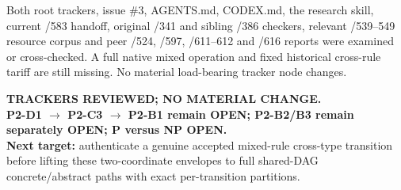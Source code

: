 \documentclass[11pt]{article}
\begin{document}
Both root trackers, issue \#3, AGENTS.md, CODEX.md, the research skill, current /583 handoff, original /341 and sibling /386 checkers, relevant /539--549 resource corpus and peer /524, /597, /611--612 and /616 reports were examined or cross-checked. A full native mixed operation and fixed historical cross-rule tariff are still missing. No material load-bearing tracker node changes.

\noindent\textbf{TRACKERS REVIEWED; NO MATERIAL CHANGE.}\\
\textbf{P2-D1 $\longrightarrow$ P2-C3 $\longrightarrow$ P2-B1 remain OPEN; P2-B2/B3 remain separately OPEN; P versus NP OPEN.}\\
\textbf{Next target:} authenticate a genuine accepted mixed-rule cross-type transition before lifting these two-coordinate envelopes to full shared-DAG concrete/abstract paths with exact per-transition partitions.
\end{document}
